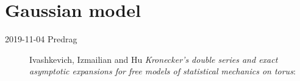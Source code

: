 
\section{Gaussian model}
\label{sect:GaussianModel}
\renewcommand\speriod[1]{{\ensuremath{\ell_{#1}}}}  %
\renewcommand\period[1]{{\ensuremath{\ell_{#1}}}}  %
\renewcommand{\ssp}{\ensuremath{\phi}}             %
\renewcommand{\Ssym}[1]{{\ensuremath{m_{#1}}}}    %


\begin{description}
\item[2019-11-04 Predrag]
Ivashkevich, Izmailian and Hu {\em Kronecker's double series
and exact asymptotic expansions for free models of statistical mechanics
on torus}:


\end{description}
